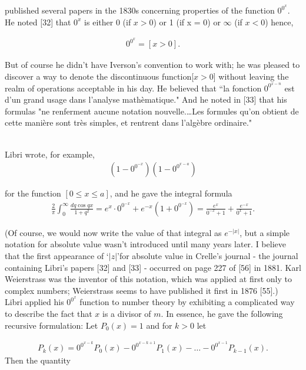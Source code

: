 \documentclass[10pt]{article}
\begin{document}
\noindent published several papers in the 1830s concerning properties of the function $0^{0^x}$. He noted [32] that $0^x$ is either 0 (if $x > 0$) or 1 (if x = 0) or ${\infty}$ (if $x < 0$) hence, 

\begin{align}
    0^{0^x} = [x>0].  
\end{align}

\noindent But of course he didn't have Iverson's convention to work with; he was pleased to discover a way to denote the discontinuous function[$x > 0$] without leaving the realm of operations acceptable in his day. He believed that ``la fonction $0^{0^{x-n}}$ est d'un grand usage dans l'analyse math\`ematique." And he noted in [33] that his formulas "ne renferment aucune notation nouvelle.\ldots Les formules qu'on obtient de cette mani\`ere sont tr\`es simples, et rentrent dans l'alg\`ebre ordinaire."

\\
\indent Libri wrote, for example,
\begin{align*}
    (1 - 0^{0^{-x}})(1 - 0^{0^{x-a}})
\end{align*}

\noindent for the function $[0 \leq x \leq a]$, and he gave the integral formula
\begin{align*}
    \frac{2}{\pi} \int_{0}^{\infty} {\frac{dq\cos qx}{1+q^2}} = e^x \cdot 0^{0^{-x}} + e^{-x} (1+0^{0^{-x}}) = \frac{e^x}{0^{-x}+1} + \frac{e^{-x}}{0^x + 1}.
\end{align*}

\noindent (Of course, we would now write the value of that integral as $e^{-|x|}$, but a simple notation for absolute value wasn’t introduced until many years later. I believe that the first appearance of `$|z|$'for absolute value in Crelle’s journal - the journal containing Libri’s papers [32] and [33] - occurred
on page 227 of [56] in 1881. Karl Weierstrass was the inventor of this notation, which was applied at first only to complex numbers; Weierstrass seems to have published it first in 1876 [55].)
\\
\indent Libri applied his $0^{0^{x}}$ function to number theory by exhibiting a complicated way to describe the fact that $x$ is a divisor of $m$.  In essence, he gave the following recursive formulation: Let $P_0(x) = 1$ and for $k > 0$ let

\begin{align*}
    P_k(x) = 0^{0^{x-k}} P_0(x) - 0^{0^{x-k+1}} P_1(x) - \ldots - 0^{0^{x-1}} P_{k-1}(x).
\end{align*}
Then the quantity
\end{document}
